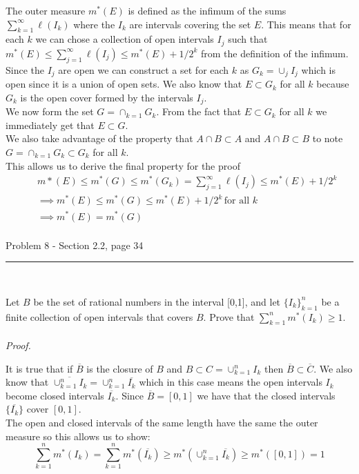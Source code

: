 \documentclass[11pt,reqno]{article}
\begin{document}
The outer measure $m^*(E)$ is defined as the infimum of the sums $\sum_{k = 1}^\infty \ell(I_k)$ where the $I_k$ are intervals covering the set $E$. This means that for each $k$ we can chose a collection of open intervals $I_j$ such that  $m^*(E) \le \sum_{j = 1}^\infty \ell(I_j) \le m^*(E) + 1/2^k$ from the definition of the infimum.\\
\indent Since the $I_j$ are open we can construct a set for each $k$ as $G_k = \cup_j I_j$ which is open since it is a union of open sets. We also know that $E \subset G_k$ for all $k$ because $G_k$ is the open cover formed by the intervals $I_j$. \\
\indent We now form the set $G = \cap_{k=1} G_k$. From the fact that $E \subset G_k$ for all $k$ we immediately get that $E \subset G$.\\
\indent We also take advantage of the property that $A \cap B \subset A$ and $A \cap B \subset B$ to note $G = \cap_{k=1} G_k \subset G_k$ for all $k$. \\
This allows us to derive the final property for the proof
\begin{eqnarray*}
&&m*(E) \le m^*(G) \le m^*(G_k) =  \sum_{j = 1}^\infty \ell(I_j) \le m^*(E) + 1/2^k\\
&& \implies m^*(E) \le m^*(G) \le m^*(E) + 1/2^k \, \text{for all $k$} \\
&& \implies m^*(E) = m^*(G)\\
\end{eqnarray*}


\begin{flushleft} 
Problem 8 - Section 2.2, page 34\\
\rule{500pt}{1pt}\\
\end{flushleft} 

Let $B$ be the set of rational numbers in the interval [0,1], and let $\{ I_k \}^n_{k=1}$ be a finite collection of open intervals that covers $B$. Prove that $\sum^n_{k=1} m^*(I_k) \ge 1$.
\\\\ \emph{Proof.}

It is true that if $\overline{B}$ is the closure of $B$ and $ B \subset C = \cup_{k = 1}^n I_k$ then $\overline{B} \subset \overline{C}$. We also know that $\overline{ \cup_{k = 1}^n I_k} = \cup_{k = 1}^n \overline{I_k}$ which in this case means the open intervals $I_k$ become closed intervals $\overline{I_k}$. Since $\overline{B} = [0,1]$ we have that the closed intervals $\{\overline{I_k}\}$ cover $[0,1]$.\\
\indent The open and closed intervals of the same length have the same the outer measure so this allows us to show:
\[ \sum_{k = 1}^n m^*(I_k) =  \sum_{k = 1}^n m^*(\overline{I_k}) \ge m^*(\cup_{k = 1}^n \overline{I_k}) \ge m^*([0,1]) = 1 \]
\end{document}
